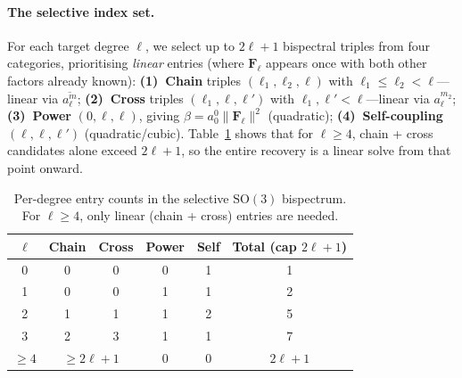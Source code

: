 \documentclass{article}
\newcommand{\SO}{\mathrm{SO}}
\newcommand{\norm}[1]{\lVert #1 \rVert}
\newcommand{\conj}[1]{\overline{#1}}
\begin{document}
\paragraph{The selective index set.}
For each target degree $\ell$, we select up to $2\ell{+}1$ bispectral
triples from four categories, prioritising \emph{linear} entries (where
$\mathbf{F}_\ell$ appears once with both other factors already known):
\textbf{(1)~Chain} triples $(\ell_1, \ell_2, \ell)$ with
$\ell_1 \leq \ell_2 < \ell$---linear via $\conj{a_\ell^m}$;
\textbf{(2)~Cross} triples $(\ell_1, \ell, \ell')$ with
$\ell_1, \ell' < \ell$---linear via $a_\ell^{m_2}$;
\textbf{(3)~Power} $(0, \ell, \ell)$, giving
$\beta = a_0^0 \norm{\mathbf{F}_\ell}^2$ (quadratic);
\textbf{(4)~Self-coupling} $(\ell, \ell, \ell')$ (quadratic/cubic).
Table~\ref{tab:entry-counts} shows that for $\ell \geq 4$,
chain + cross candidates alone exceed $2\ell{+}1$, so the entire
recovery is a linear solve from that point onward.

\begin{table}[h]
  \caption{Per-degree entry counts in the selective $\SO(3)$ bispectrum.
    For $\ell \geq 4$, only linear (chain + cross) entries are needed.}
  \label{tab:entry-counts}
  \centering
  \small
  \begin{tabular}{cccccc}
    \toprule
    $\ell$ & Chain & Cross & Power & Self & Total (cap $2\ell{+}1$) \\
    \midrule
    0 & 0 & 0 & 0 & 1 & 1 \\
    1 & 0 & 0 & 1 & 1 & 2 \\
    2 & 1 & 1 & 1 & 2 & 5 \\
    3 & 2 & 3 & 1 & 1 & 7 \\
    $\geq 4$ & \multicolumn{2}{c}{$\geq 2\ell{+}1$} & 0 & 0 & $2\ell{+}1$ \\
    \bottomrule
  \end{tabular}
\end{table}
\end{document}
